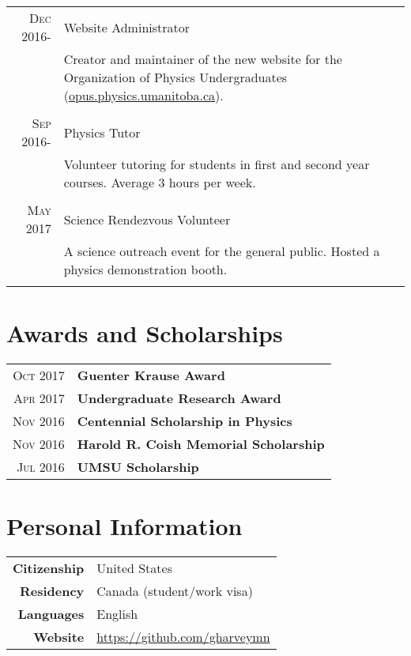 \documentclass[letter,10pt]{article} %
\begin{document}
\begin{tabular}{r|p{9.5cm}}
\textsc{Dec} 2016- & Website Administrator \\
& \footnotesize{Creator and maintainer of the new website for the Organization of Physics Undergraduates (\href{opus.physics.umanitoba.ca}{opus.physics.umanitoba.ca}).}\\
\multicolumn{2}{c}{} \\


\textsc{Sep} 2016- & Physics Tutor \\ 
& \footnotesize{Volunteer tutoring for students in first and second year courses. Average 3 hours per week.}\\
\multicolumn{2}{c}{} \\


\textsc{May} 2017 & Science Rendezvous Volunteer \\
& \footnotesize{A science outreach event for the general public. Hosted a physics demonstration booth.}\\
\multicolumn{2}{c}{} \\
\end{tabular}


\section{Awards and Scholarships}

\begin{tabular}{rl}
\textsc{Oct} 2017 & \textbf{Guenter Krause Award} \\
\textsc{Apr} 2017 & \textbf{Undergraduate Research Award} \\
\textsc{Nov} 2016 & \textbf{Centennial Scholarship in Physics} \\
\textsc{Nov} 2016 & \textbf{Harold R. Coish Memorial Scholarship} \\
\textsc{Jul} 2016 & \textbf{UMSU Scholarship}
\end{tabular}

\section{Personal Information}
\begin{center}
\begin{tabular}{rl}
\textbf{Citizenship} & United States \\
\textbf{Residency} & Canada (student/work visa) \\
\textbf{Languages} & English \\
\textbf{Website} & \href{https://github.com/gharveymn}{https://github.com/gharveymn}
\end{tabular}
\end{center}
\end{document}
